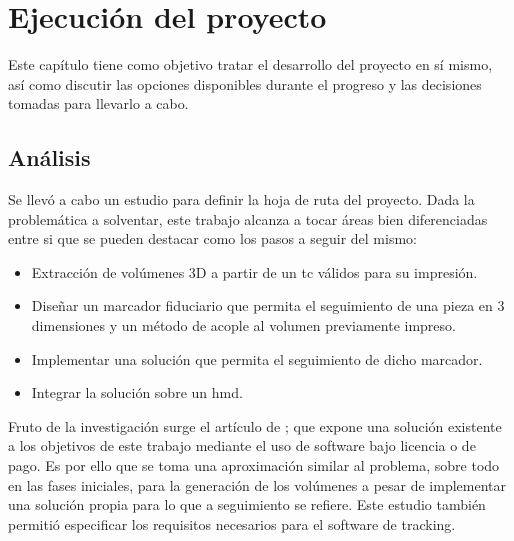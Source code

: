 \chapter{Ejecución del proyecto}
\label{chap:edp}
Este capítulo tiene como objetivo tratar el desarrollo del proyecto en sí mismo, así como discutir las opciones disponibles durante el progreso y las decisiones tomadas para llevarlo a cabo.
\section{Análisis}
Se llevó a cabo un estudio para definir la hoja de ruta del proyecto. Dada la problemática a solventar, este trabajo alcanza a tocar áreas bien diferenciadas entre si que se pueden destacar como los pasos a seguir del mismo:
\begin{itemize}
    \item Extracción de volúmenes 3D a partir de un \acrshort{tc} válidos para su impresión.
    \item Diseñar un marcador fiduciario que permita el seguimiento de una pieza en 3 dimensiones y un método de acople al volumen previamente impreso.
    \item Implementar una solución que permita el seguimiento de dicho marcador.
    \item Integrar la solución sobre un \acrshort{hmd}.
\end{itemize}

Fruto de la investigación surge el artículo de  \citeauthor{MoretaMartinez2020}; que expone una solución existente a los objetivos de este trabajo mediante el uso de software bajo licencia o de pago.  Es por ello que se toma una aproximación similar al problema, sobre todo en las fases iniciales, para la generación de los volúmenes a pesar de implementar una solución propia para lo que a seguimiento se refiere. Este estudio también permitió especificar los requisitos necesarios para el software de tracking.

